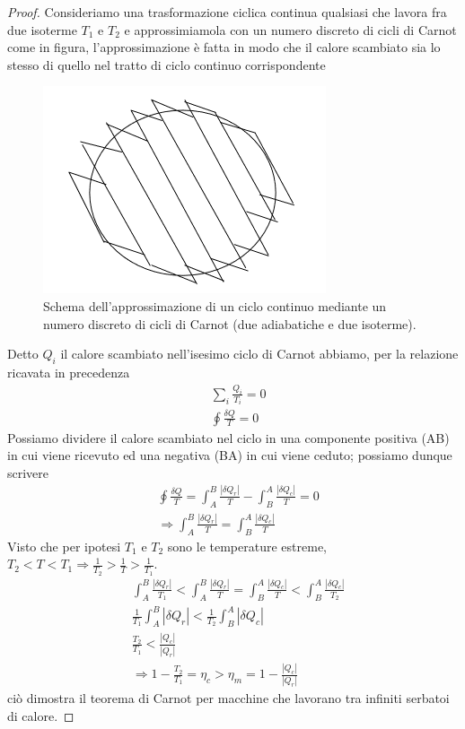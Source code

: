 \documentclass[
10pt, %
a4paper, %
oneside, %
headinclude,footinclude, %
BCOR5mm, %
]{scrartcl}
\begin{document}
\begin{proof}
Consideriamo una trasformazione ciclica continua qualsiasi che lavora fra due isoterme \(T_1\) e \(T_2\) e approssimiamola con un numero discreto di cicli di Carnot come in figura, l'approssimazione è fatta in modo che il calore scambiato sia lo stesso di quello nel tratto di ciclo continuo corrispondente
\begin{figure}[h!]
	\centering
	\includegraphics[width=0.5\linewidth]{../images/ciclo_continuo}
	\caption{Schema dell'approssimazione di un ciclo continuo mediante un numero discreto di cicli di Carnot (due adiabatiche e due isoterme).}
	\label{fig:ciclocontinuo}
\end{figure}
\FloatBarrier
Detto \(Q_i\) il calore scambiato nell'isesimo ciclo di Carnot abbiamo, per la relazione ricavata in precedenza
\begin{align*}
	&\sum_i \frac{Q_i}{T_i} = 0\\
	&\oint \frac{\delta Q}{T} = 0
\end{align*}
Possiamo dividere il calore scambiato nel ciclo in una componente positiva (AB) in cui viene ricevuto ed una negativa (BA) in cui viene ceduto; possiamo dunque scrivere
\begin{align*}
	&\oint \frac{\delta Q}{T} = \int_A^B \frac{|\delta Q_r|}{T}- \int_B^A \frac{|\delta Q_c|}{T}= 0\\
	&\Rightarrow \int_A^B \frac{|\delta Q_r|}{T} = \int_B^A \frac{|\delta Q_c|}{T}
\end{align*}
Visto che per ipotesi \(T_1\) e \(T_2\) sono le temperature estreme, \(T_2<T<T_1 \Rightarrow \frac{1}{T_2}>\frac{1}{T}>\frac{1}{T_1}\).
\begin{align*}
	&\int_A^B \frac{|\delta Q_r|}{T_1} < \int_A^B \frac{|\delta Q_r|}{T} = \int_B^A \frac{|\delta Q_c|}{T} < \int_B^A \frac{|\delta Q_c|}{T_2}\\
	&\frac{1}{T_1} \int_A^B |\delta Q_r| < \frac{1}{T_2} \int_B^A |\delta Q_c|\\
	&\frac{T_2}{T_1} < \frac{|Q_c|}{|Q_r|}\\
	&\Rightarrow 1-\frac{T_2}{T_1} = \eta_c > \eta_m = 1-\frac{|Q_c|}{|Q_r|}
\end{align*} 
ciò dimostra il teorema di Carnot per macchine che lavorano tra infiniti serbatoi di calore. 
\end{proof}
\end{document}

